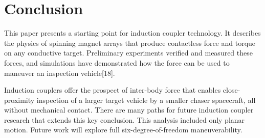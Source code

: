 \section{Conclusion}
This paper presents a starting point for induction coupler technology. It describes the physics of spinning magnet arrays that produce contactless force and torque on any conductive target. Preliminary experiments verified and measured these forces, and simulations have demonstrated how the force can be used to maneuver an inspection vehicle[18]. 

Induction couplers offer the prospect of inter-body force that enables close-proximity inspection of a larger target vehicle by a smaller chaser spacecraft, all without mechanical contact. There are many paths for future induction coupler research that extends this key conclusion. This analysis included only planar motion. Future work will explore full six-degree-of-freedom maneuverability.